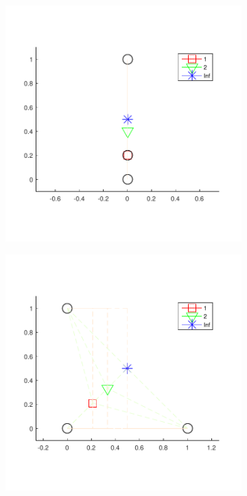 \documentclass[letterpaper,12pt,]{article}
\begin{document}
\begin{figure}[ht] 
  \begin{subfigure}[b]{0.5\linewidth}
    \centering
    \includegraphics[width=0.9\linewidth]{fac4} 
  \end{subfigure}%
  \begin{subfigure}[b]{0.5\linewidth}
    \centering
    \includegraphics[width=0.9\linewidth]{fac1} 

\end{subfigure}
\end{figure}
\end{document}

